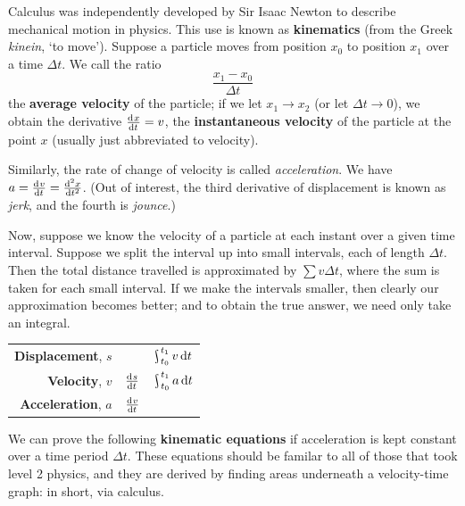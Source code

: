 


Calculus was independently developed by Sir Isaac Newton to describe mechanical motion in physics. This use is known as \textbf{kinematics} (from
the Greek \textit{kinein}, `to move'). Suppose a particle moves from position $ x_0 $ to position $ x_1 $ over a time $ \Delta t $. We call the ratio
\begin{displaymath}
  \frac{x_1 - x_0}{\Delta t}
\end{displaymath}
the \textbf{average velocity} of the particle; if we let $ x_1 \to x_2 $ (or let $ \Delta t \to 0 $), we obtain the derivative $ \od{x}{t} = v $, the
\textbf{instantaneous velocity} of the particle at the point $ x $ (usually just abbreviated to velocity).

Similarly, the rate of change of velocity is called \textit{acceleration}. We have $ a = \od{v}{t} = \od[2]{x}{t} $. (Out of interest, the third
derivative of displacement is known as \textit{jerk}, and the fourth is \textit{jounce}.)

Now, suppose we know the velocity of a particle at each instant over a given time interval. Suppose we split the interval up into small intervals,
each of length $ \Delta t $. Then the total distance travelled is approximated by $ \sum v \Delta t $, where the sum is taken for each small interval.
If we make the intervals smaller, then clearly our approximation becomes better; and to obtain the true answer, we need only take an integral.

\begin{center}
  \def\arraystretch{1.5}
  \begin{tabular}{|rcc|}\hline
    \textbf{Displacement}, $ s $ && $\rint_{t_0}^{t_1} v \dif{t} $\\
    \textbf{Velocity}, $ v $ & $ \od{s}{t} $ & $ \rint_{t_0}^{t_1} a \dif{t} $\\
    \textbf{Acceleration}, $ a $ & $ \od{v}{t} $ &\\\hline
  \end{tabular}
\end{center}

We can prove the following \textbf{kinematic equations} if acceleration is kept constant over a time period $ \Delta t $. These equations
should be familar to all of those that took level 2 physics, and they are derived by finding areas underneath a velocity-time graph: in
short, via calculus.

